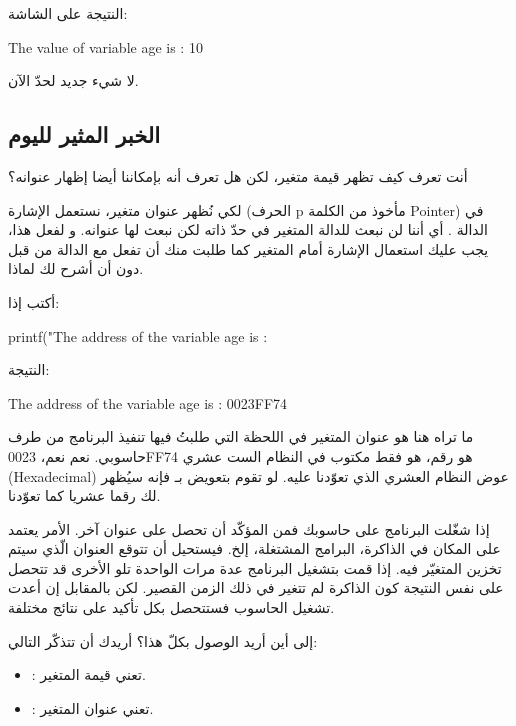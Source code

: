 النتيجة على الشاشة:

\begin{Console}
The value of variable age is : 10
\end{Console}

لا شيء جديد لحدّ الآن.

\subsection{الخبر المثير لليوم}

أنت تعرف كيف تظهر قيمة متغير، لكن هل تعرف أنه بإمكاننا أيضا إظهار عنوانه؟

لكي نُظهر عنوان متغير، نستعمل الإشارة
(الحرف
\textenglish{p}
مأخوذ من الكلمة
\textenglish{Pointer})
في الدالة
.
أي أننا لن نبعث للدالة
المتغير في حدّ ذاته لكن نبعث لها عنوانه. و لفعل هذا، يجب عليك استعمال الإشارة
\InlineCode{\&}
أمام المتغير
كما طلبت منك أن تفعل مع الدالة
من قبل دون أن أشرح لك لماذا.

أكتب إذا:

\begin{Csource}
printf("The address of the variable age is : %
\end{Csource}
النتيجة:

\begin{Console}
The address of the variable age is : 0023FF74
\end{Console}

ما تراه هنا هو عنوان المتغير
في اللحظة التي طلبتُ فيها تنفيذ البرنامج من طرف حاسوبي. نعم نعم،
0023FF74
هو رقم، هو فقط مكتوب في النظام الست عشري
(\textenglish{Hexadecimal})
عوض النظام العشري الذي تعوّدنا عليه. لو تقوم بتعويض
بـ
فإنه سيُظهر لك رقما عشريا كما تعوّدنا.

\begin{information}
	إذا شغّلت البرنامج على حاسوبك فمن المؤكّد أن تحصل على عنوان آخر. الأمر يعتمد على المكان في الذاكرة، البرامج المشتغلة، إلخ.
فيستحيل أن تتوقع العنوان الّذي سيتم تخزين المتغيّر فيه.
إذا قمت بتشغيل البرنامج عدة مرات الواحدة تلو الأخرى قد تتحصل على نفس النتيجة كون الذاكرة لم تتغير في ذلك الزمن القصير.
لكن بالمقابل إن أعدت تشغيل الحاسوب فستتحصل بكل تأكيد على نتائج مختلفة.
\end{information}

إلى أين أريد الوصول بكلّ هذا؟ أريدك أن تتذكّر التالي:

\begin{itemize}
	\item {}: تعني قيمة المتغير.
	\item {}: تعني عنوان المتغير.
\end{itemize}


